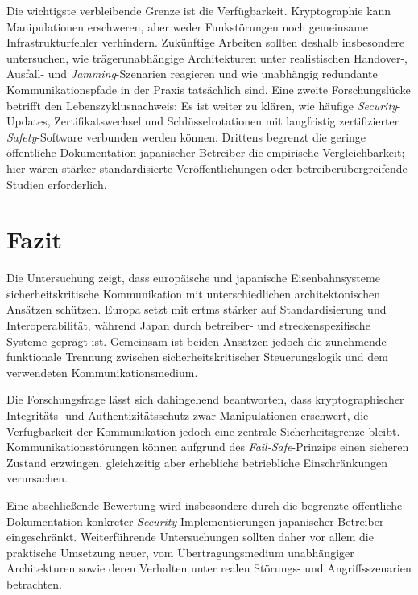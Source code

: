 \documentclass[runningheads]{res/llncs}
\begin{document}
Die wichtigste verbleibende Grenze ist die Verfügbarkeit. Kryptographie kann Manipulationen erschweren, aber weder Funkstörungen noch gemeinsame Infrastrukturfehler verhindern. Zukünftige Arbeiten sollten deshalb insbesondere untersuchen, wie trägerunabhängige Architekturen unter realistischen Handover-, Ausfall- und \textit{Jamming}-Szenarien reagieren und wie unabhängig redundante Kommunikationspfade in der Praxis tatsächlich sind. Eine zweite Forschungslücke betrifft den Lebenszyklusnachweis: Es ist weiter zu klären, wie häufige \textit{Security}-Updates, Zertifikatswechsel und Schlüsselrotationen mit langfristig zertifizierter \textit{Safety}-Software verbunden werden können. Drittens begrenzt die geringe öffentliche Dokumentation japanischer Betreiber die empirische Vergleichbarkeit; hier wären stärker standardisierte Veröffentlichungen oder betreiberübergreifende Studien erforderlich.

\section{Fazit}
\label{sec:Fazit}

Die Untersuchung zeigt, dass europäische und japanische Eisenbahnsysteme sicherheitskritische Kommunikation mit unterschiedlichen architektonischen Ansätzen schützen. Europa setzt mit \gls{ertms} stärker auf Standardisierung und Interoperabilität, während Japan durch betreiber- und streckenspezifische Systeme geprägt ist. Gemeinsam ist beiden Ansätzen jedoch die zunehmende funktionale Trennung zwischen sicherheitskritischer Steuerungslogik und dem verwendeten Kommunikationsmedium.

Die Forschungsfrage lässt sich dahingehend beantworten, dass kryptographischer Integritäts- und Authentizitätsschutz zwar Manipulationen erschwert, die Verfügbarkeit der Kommunikation jedoch eine zentrale Sicherheitsgrenze bleibt. Kommunikationsstörungen können aufgrund des \textit{Fail-Safe}-Prinzips einen sicheren Zustand erzwingen, gleichzeitig aber erhebliche betriebliche Einschränkungen verursachen.

Eine abschließende Bewertung wird insbesondere durch die begrenzte öffentliche Dokumentation konkreter \textit{Security}-Implementierungen japanischer Betreiber eingeschränkt. Weiterführende Untersuchungen sollten daher vor allem die praktische Umsetzung neuer, vom Übertragungsmedium unabhängiger Architekturen sowie deren Verhalten unter realen Störungs- und Angriffsszenarien betrachten.

\newpage



\newpage
\printbibliography

% 
% 
\end{document}
